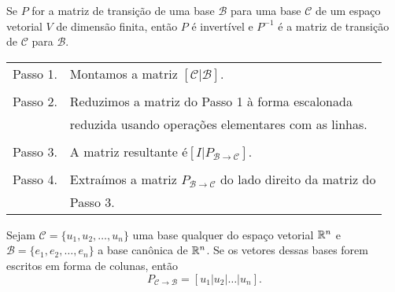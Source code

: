 \documentclass{beamer}
\begin{document}
\begin{frame}
    \begin{teorema}
        Se $P$ for a matriz de transição de uma base $\mathcal{B}$ para uma base $\mathcal{C}$ de um espaço vetorial $V$ de dimensão finita, então $P$ é invertível e $P^{-1}$ é a matriz de transição de $\mathcal{C}$ para $\mathcal{B}$.
    \end{teorema}
\end{frame}

\begin{frame}
    \begin{tcolorbox}[colback=green!30, colframe=green!80!blue, title=Procedimento para calcular $P_{\mathcal{B} \to \mathcal{C}}$]
        \begin{tabular}{ll}
            Passo 1. & Montamos a matriz $[\mathcal{C} | \mathcal{B}]$.\\
            \\
            Passo 2. & Reduzimos a matriz do Passo 1 à forma escalonada\\
            & reduzida usando operações elementares com as linhas.\\
            \\
            Passo 3. & A matriz resultante é$[I | P_{\mathcal{B} \to \mathcal{C}}]$.\\
            \\
            Passo 4. & Extraímos a matriz $P_{\mathcal{B} \to \mathcal{C}}$ do lado direito da matriz do\\
            & Passo 3.
        \end{tabular}
    \end{tcolorbox}
\end{frame}

\begin{frame}
    \begin{teorema}
        Sejam $\mathcal{C} = \{u_1, u_2, \dots, u_n\}$ uma base qualquer do espaço vetorial $\mathbb{R}^n$ e $\mathcal{B} = \{e_1, e_2, \dots, e_n\}$ a base canônica de $\mathbb{R}^n$. Se os vetores dessas bases forem escritos em forma de colunas, então
        \[
            P_{\mathcal{C} \to \mathcal{B}} = [u_1 | u_2 | \dots | u_n].
        \]
    \end{teorema}
\end{frame}
\end{document}
